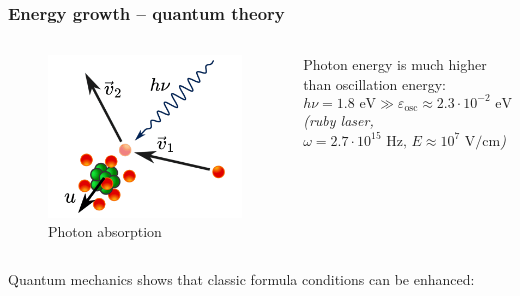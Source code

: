 \documentclass{beamer}
\begin{document}
	\begin{frame}
		\frametitle{Energy growth -- quantum theory}
		
		\begin{columns}
			\begin{figure}
				\centering
				\includegraphics[width=0.8\linewidth]{res/collision_with_recoil.png}
				\caption*{Photon absorption}
			\end{figure}
			
			Photon energy is much higher than oscillation energy:
			$$  h\nu = 1.8 \text{ eV} \gg\varepsilon_{\text{osc}} \approx 2.3\cdot 10^{-2} \text{ eV} $$
			\footnotesize
			\emph{(ruby laser, $\omega = 2.7 \cdot 10^{15} \text{ Hz, } E \approx 10^7 \text{ V/cm}$)}
		\end{columns}
		
		Quantum mechanics shows that classic formula conditions can be enhanced:
		\begin{center}
		\end{center}
		
		
		
	\end{frame}
	
\end{document}
